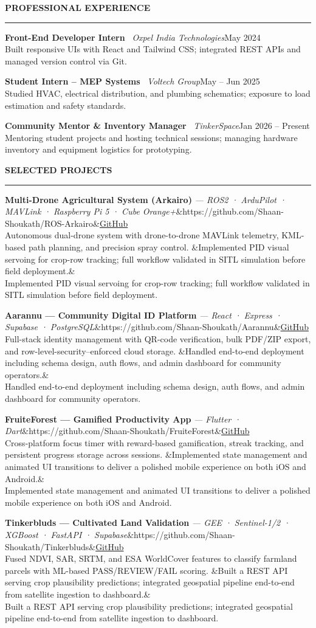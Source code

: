 \documentclass[10.8pt, a4paper]{article}
\newcommand{\cvsection}[1]{%
  \vspace{7pt}%
  {\color{accent}\textbf{\MakeUppercase{#1}}}\\[-5pt]
  {\color{rulecol}\rule{\linewidth}{0.5pt}}%
  \vspace{2pt}%
}
\newcommand{\entry}[4]{%
  \textbf{#1} \textbar\ \textit{#2}\hfill{\small\color{subtle}#3}\\
  {\small #4}%
}
\newcommand{\project}[5]{%
  \textbf{#1} {\small\color{subtle}\textit{— #2}}\ifx&#5&\else\hfill{\small\href{#5}{\textcolor{accent}{GitHub}}}\fi\\
  {\small #3}%
  \ifx&#4&\else\\ {\small #4}\fi%
}
\begin{document}
\cvsection{Professional Experience}

\entry{Front-End Developer Intern}{Oxpel India Technologies}{May 2024}%
      {Built responsive UIs with React and Tailwind CSS; integrated REST APIs and managed version control via Git.}

\vspace{4pt}
\entry{Student Intern – MEP Systems}{Voltech Group}{May – Jun 2025}%
      {Studied HVAC, electrical distribution, and plumbing schematics; exposure to load estimation and safety standards.}

\vspace{4pt}
\entry{Community Mentor \& Inventory Manager}{TinkerSpace}{Jan 2026 – Present}%
      {Mentoring student projects and hosting technical sessions; managing hardware inventory and equipment logistics for prototyping.}

\cvsection{Selected Projects}

\project{Multi-Drone Agricultural System (Arkairo)}{ROS2 · ArduPilot · MAVLink · Raspberry Pi 5 · Cube Orange+}%
        {Autonomous dual-drone system with drone-to-drone MAVLink telemetry, KML-based path planning, and precision spray control.}%
        {Implemented PID visual servoing for crop-row tracking; full workflow validated in SITL simulation before field deployment.}%
        {https://github.com/Shaan-Shoukath/ROS-Arkairo}

\vspace{4pt}
\project{Aarannu — Community Digital ID Platform}{React · Express · Supabase · PostgreSQL}%
        {Full-stack identity management with QR-code verification, bulk PDF/ZIP export, and row-level-security–enforced cloud storage.}%
        {Handled end-to-end deployment including schema design, auth flows, and admin dashboard for community operators.}%
        {https://github.com/Shaan-Shoukath/Aarannu}

\vspace{4pt}
\project{FruiteForest — Gamified Productivity App}{Flutter · Dart}%
        {Cross-platform focus timer with reward-based gamification, streak tracking, and persistent progress storage across sessions.}%
        {Implemented state management and animated UI transitions to deliver a polished mobile experience on both iOS and Android.}%
        {https://github.com/Shaan-Shoukath/FruiteForest}

\vspace{4pt}
\project{Tinkerbluds — Cultivated Land Validation}{GEE · Sentinel-1/2 · XGBoost · FastAPI · Supabase}%
        {Fused NDVI, SAR, SRTM, and ESA WorldCover features to classify farmland parcels with ML-based PASS/REVIEW/FAIL scoring.}%
        {Built a REST API serving crop plausibility predictions; integrated geospatial pipeline end-to-end from satellite ingestion to dashboard.}%
        {https://github.com/Shaan-Shoukath/Tinkerbluds}
\end{document}
